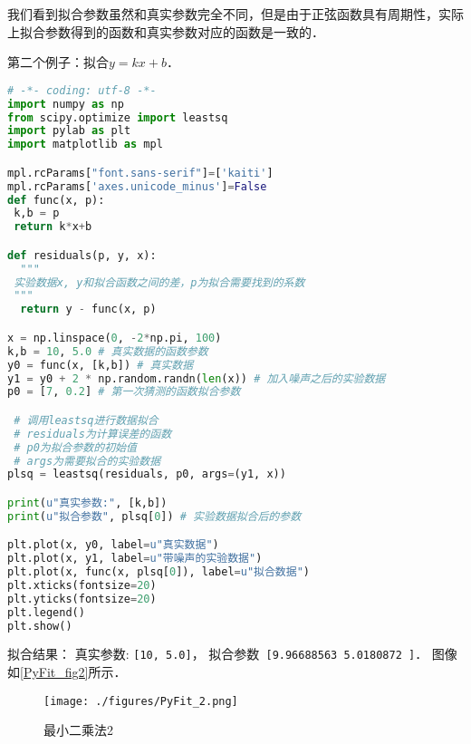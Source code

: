 我们看到拟合参数虽然和真实参数完全不同，但是由于正弦函数具有周期性，实际上拟合参数得到的函数和真实参数对应的函数是一致的．

第二个例子：拟合$y=kx+b$．
\begin{lstlisting}[language=python]
# -*- coding: utf-8 -*-
import numpy as np
from scipy.optimize import leastsq
import pylab as plt
import matplotlib as mpl

mpl.rcParams["font.sans-serif"]=['kaiti']
mpl.rcParams['axes.unicode_minus']=False
def func(x, p):
 k,b = p
 return k*x+b

def residuals(p, y, x):
  """
 实验数据x, y和拟合函数之间的差，p为拟合需要找到的系数
 """
  return y - func(x, p)

x = np.linspace(0, -2*np.pi, 100)
k,b = 10, 5.0 # 真实数据的函数参数
y0 = func(x, [k,b]) # 真实数据
y1 = y0 + 2 * np.random.randn(len(x)) # 加入噪声之后的实验数据
p0 = [7, 0.2] # 第一次猜测的函数拟合参数

 # 调用leastsq进行数据拟合
 # residuals为计算误差的函数
 # p0为拟合参数的初始值
 # args为需要拟合的实验数据
plsq = leastsq(residuals, p0, args=(y1, x))

print(u"真实参数:", [k,b])
print(u"拟合参数", plsq[0]) # 实验数据拟合后的参数

plt.plot(x, y0, label=u"真实数据")
plt.plot(x, y1, label=u"带噪声的实验数据")
plt.plot(x, func(x, plsq[0]), label=u"拟合数据")
plt.xticks(fontsize=20)
plt.yticks(fontsize=20)
plt.legend()
plt.show()
\end{lstlisting}
拟合结果： 真实参数: \verb|[10, 5.0]|， 拟合参数\verb| [9.96688563 5.0180872 ]|． 图像如\autoref{PyFit_fig2}所示．
\begin{figure}[ht]
\centering
\texttt{[image: ./figures/PyFit\_2.png]}
\caption{最小二乘法2} \label{PyFit_fig2}
\end{figure}


